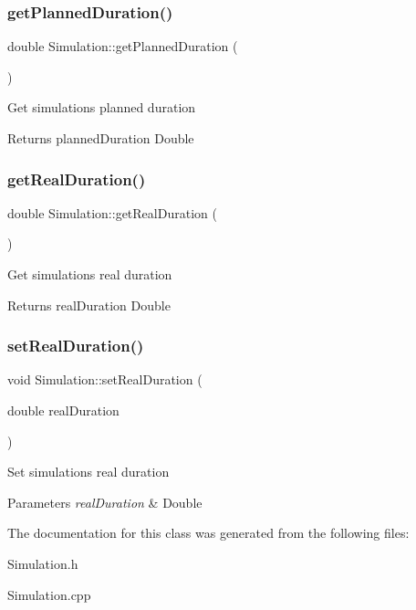 \subsubsection{\texorpdfstring{get\+Planned\+Duration()}{getPlannedDuration()}}
{\footnotesize\ttfamily double Simulation\+::get\+Planned\+Duration (\begin{DoxyParamCaption}{ }\end{DoxyParamCaption})}

Get simulation\textquotesingle{}s planned duration \begin{DoxyReturn}{Returns}
planned\+Duration Double 
\end{DoxyReturn}
\mbox{\label{classSimulation_a18218154310af27c087def0936690346}} 
\subsubsection{\texorpdfstring{get\+Real\+Duration()}{getRealDuration()}}
{\footnotesize\ttfamily double Simulation\+::get\+Real\+Duration (\begin{DoxyParamCaption}{ }\end{DoxyParamCaption})}

Get simulation\textquotesingle{}s real duration \begin{DoxyReturn}{Returns}
real\+Duration Double 
\end{DoxyReturn}
\mbox{\label{classSimulation_af7d8147539e8ea62f83c44fa0431e27d}} 
\subsubsection{\texorpdfstring{set\+Real\+Duration()}{setRealDuration()}}
{\footnotesize\ttfamily void Simulation\+::set\+Real\+Duration (\begin{DoxyParamCaption}\item[{double}]{real\+Duration }\end{DoxyParamCaption})}

Set simulation\textquotesingle{}s real duration 
\begin{DoxyParams}{Parameters}
{\em real\+Duration} & Double \\
\hline
\end{DoxyParams}


The documentation for this class was generated from the following files\+:\begin{DoxyCompactItemize}
\item 
Simulation.\+h\item 
Simulation.\+cpp\end{DoxyCompactItemize}
